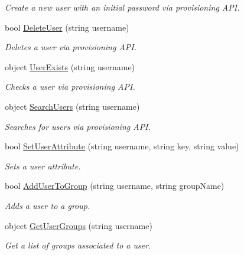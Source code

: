 \begin{DoxyCompactItemize}
\begin{DoxyCompactList}\small\item\em Create a new user with an initial password via provisioning A\+P\+I. \end{DoxyCompactList}\item 
bool \hyperlink{classowncloudsharp_1_1_client_a0603de03c323c55dc53cea24516ecf31}{Delete\+User} (string username)
\begin{DoxyCompactList}\small\item\em Deletes a user via provisioning A\+P\+I. \end{DoxyCompactList}\item 
object \hyperlink{classowncloudsharp_1_1_client_ac5c4564d7ef95b6fe8aa912f447e1644}{User\+Exists} (string username)
\begin{DoxyCompactList}\small\item\em Checks a user via provisioning A\+P\+I. \end{DoxyCompactList}\item 
object \hyperlink{classowncloudsharp_1_1_client_aa324d53147f5952788d983201fc7fcb7}{Search\+Users} (string username)
\begin{DoxyCompactList}\small\item\em Searches for users via provisioning A\+P\+I. \end{DoxyCompactList}\item 
bool \hyperlink{classowncloudsharp_1_1_client_a788f66e2d774a7c47e0a46918a50c5b5}{Set\+User\+Attribute} (string username, string key, string value)
\begin{DoxyCompactList}\small\item\em Sets a user attribute. \end{DoxyCompactList}\item 
bool \hyperlink{classowncloudsharp_1_1_client_a7b8657d971f2b1a9f27f2b8cfc73a21b}{Add\+User\+To\+Group} (string username, string group\+Name)
\begin{DoxyCompactList}\small\item\em Adds a user to a group. \end{DoxyCompactList}\item 
object \hyperlink{classowncloudsharp_1_1_client_a0ab2a296d77fa4def48b46a8d7b99da2}{Get\+User\+Groups} (string username)
\begin{DoxyCompactList}\small\item\em Get a list of groups associated to a user. \end{DoxyCompactList}\item 

\end{DoxyCompactItemize}
